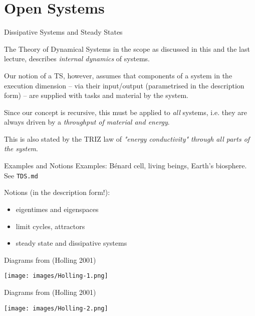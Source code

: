 \documentclass{beamer}
\title{Modelling Sustainable Systems\\ and Semantic Web\\[6pt]
  Development of Systems and Their Components
  \vskip1em}
\subtitle{Lecture in the Module 10-202-2309\\ for Master Computer Science}
\author{Prof. Dr. Hans-Gert Gräbe\\
\url{http://www.informatik.uni-leipzig.de/~graebe}}
\date{May 2021}
\begin{document}
{
\begin{frame}
  \titlepage
\end{frame}}

\section{Open Systems}
\begin{frame}{Dissipative Systems and Steady States}

  The Theory of Dynamical Systems in the scope as discussed in this and the
  last lecture, describes \emph{internal dynamics} of systems.

  Our notion of a TS, however, assumes that components of a system in the
  execution dimension -- via their input/output (parametrised in the
  description form) -- are supplied with tasks and material by the system.

  Since our concept is recursive, this must be applied to \emph{all} systems,
  i.e.  they are always driven by a \emph{throughput of material and energy}.

  This is also stated by the TRIZ law of \emph{"energy conductivity" through
    all parts of the system}.
\end{frame}

\begin{frame}{Examples and Notions}
  Examples: Bénard cell, living beings, Earth's biosphere.  See
  \texttt{TDS.md}

  Notions (in the description form!): 
  \begin{itemize}
  \item eigentimes and eigenspaces
  \item limit cycles, attractors
  \item steady state and dissipative systems
  \end{itemize}
\end{frame}

\begin{frame}{Diagrams from (Holling 2001)}
  \begin{center}
    \texttt{[image: images/Holling-1.png]}
  \end{center}
\end{frame}

\begin{frame}{Diagrams from (Holling 2001)}
  \begin{center}
    \texttt{[image: images/Holling-2.png]}
  \end{center}
\end{frame}
\end{document}
